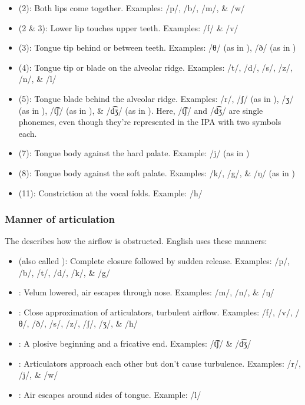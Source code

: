 \begin{itemize}[noitemsep]
    \item {} (2): Both lips come together. Examples: /p/, /b/, /m/, \& /w/
    \item {} (2 \& 3): Lower lip touches upper teeth. Examples: /f/ \& /v/
    \item {} (3): Tongue tip behind or between teeth. Examples: /θ/ (as in ), /ð/ (as in )
    \item {} (4): Tongue tip or blade on the alveolar ridge. Examples: /t/, /d/, /s/, /z/, /n/, \& /l/
    \item {} (5): Tongue blade behind the alveolar ridge. Examples: /r/, /ʃ/ (as in ), /ʒ/ (as in ), /t͡ʃ/ (as in ), \& /d͡ʒ/ (as in ). Here, /t͡ʃ/ and /d͡ʒ/ are single phonemes, even though they're represented in the IPA with two symbols each.
    \item {} (7): Tongue body against the hard palate. Example: /j/ (as in )
    \item {} (8): Tongue body against the soft palate. Examples: /k/, /g/, \& /ŋ/ (as in )
    \item {} (11): Constriction at the vocal folds. Example: /h/
\end{itemize}

\subsubsection{Manner of articulation}

The  describes how the airflow is obstructed. English uses these manners:

\begin{itemize}[noitemsep]
    \item {} (also called ): Complete closure followed by sudden release. Examples: /p/, /b/, /t/, /d/, /k/, \& /g/
    \item {}: Velum lowered, air escapes through nose. Examples: /m/, /n/, \& /ŋ/
    \item {}: Close approximation of articulators, turbulent airflow. Examples: /f/, /v/, /θ/, /ð/, /s/, /z/, /ʃ/, /ʒ/, \& /h/
    \item {}: A plosive beginning and a fricative end. Examples: /t͡ʃ/ \& /d͡ʒ/
    \item {}: Articulators approach each other but don't cause turbulence. Examples: /r/, /j/, \& /w/
    \item {}: Air escapes around sides of tongue. Example: /l/
\end{itemize}

